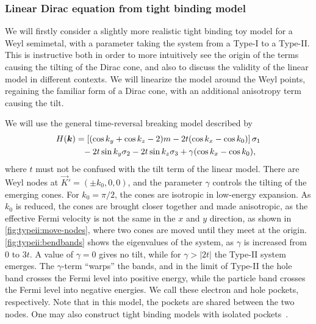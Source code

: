 \subsubsection{Linear Dirac equation from tight binding model}
\label{sec:tilt:tightbindingmodel}
We will firstly consider a slightly more realistic tight binding toy model for a Weyl semimetal, with a parameter taking the system from a Type-I to a Type-II.
This is instructive both in order to more intuitively see the origin of the terms causing the tilting of the Dirac cone, and also to discuss the validity of the linear model in different contexts.
We will linearize the model around the Weyl points, regaining the familiar form of a Dirac cone, with an additional anisotropy term causing the tilt.

We will use the general time-reversal breaking model described by~\textcite{mccormickMinimalModelsTopological2017}
\begin{equation}
  \begin{split}
    H(\vec{k}) &= \left[ ( \cos k_y + \cos k_z - 2 )m - 2 t (\cos k_x - \cos k_0) \right] \sigma_1\\
    &\pe - 2 t \sin k_y \sigma_2 - 2t \sin k_z \sigma_3
    + \gamma (\cos k_x - \cos k_0),
  \end{split}
\end{equation}
where \( t \) must not be confused with the tilt term of the linear model.
There are Weyl nodes at \(\vec{K}' = (\pm k_{0}, 0,0)\), and the parameter $\gamma$ controls the tilting of the emerging cones.
For \( k_0 = \pi /2 \), the cones are isotropic in low-energy expansion.
As \( k_0 \) is reduced, the cones are brought closer together and made anisotropic, as the effective Fermi velocity is not the same in the \( x \) and \( y \) direction, as shown in \cref{fig:typeii:move-nodes}, where two cones are moved until they meet at the origin.
\cref{fig:typeii:bendbands} shows the eigenvalues of the system, as \( \gamma \) is increased from 0 to \( 3t \).
A value of $\gamma=0$ gives no tilt, while for $\gamma > |2 t|$ the Type-II system emerges.
The \(\gamma\)-term ``warps'' the bands, and in the limit of Type-II the hole band crosses the Fermi level into positive energy, while the particle band crosses the Fermi level into negative energies.
We call these electron and hole pockets, respectively.
Note that in this model, the pockets are shared between the two nodes.
One may also construct tight binding models with isolated pockets~\cite{mccormickMinimalModelsTopological2017}.

